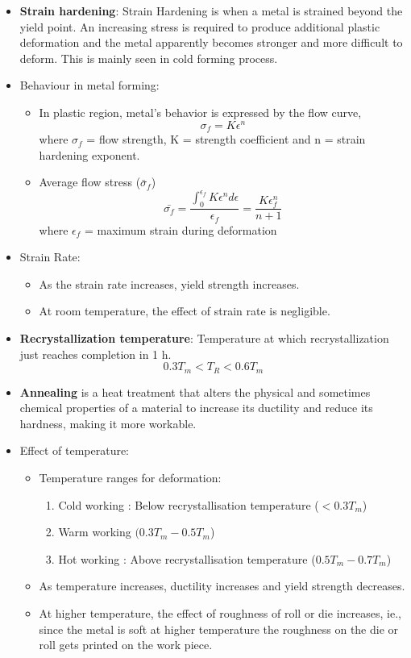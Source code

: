 \documentclass{article}
\begin{document}
	\begin{itemize}
		\item \textbf{Strain hardening}: Strain Hardening is when a metal is strained beyond the yield point. An increasing stress is required to produce additional plastic deformation and the metal apparently becomes stronger and more difficult to deform. This is mainly seen in cold forming process. 

		\item Behaviour in metal forming:
			\begin{itemize}
				\item In plastic region, metal's behavior is expressed by the flow curve, 
					\[\boxed{\sigma_f = K \epsilon^n}\]
				where $\sigma_f$ = flow strength, K = strength coefficient and n = strain hardening exponent. 
				\item Average flow stress (${\bar \sigma_f}$)
					\[{\bar{\sigma_f}= \frac{\int_0^{\epsilon_f} K \epsilon^n d\epsilon}{\epsilon_f} = \frac{K \epsilon_f^n}{n+1}}\]
				where $\epsilon_f$ = maximum strain during deformation
			\end{itemize}

		\item Strain Rate:
			\begin{itemize}
				\item As the strain rate increases, yield strength increases. 
				\item At room temperature, the effect of strain rate is negligible. 
			\end{itemize}

		\item \textbf{Recrystallization temperature}: Temperature at which recrystallization just reaches completion in 1 h.
		\[0.3T_m < T_R < 0.6T_m\]
		\item \textbf{Annealing} is a heat treatment that alters the physical and sometimes chemical properties of a material to increase its ductility and reduce its hardness, making it more workable.

		\item Effect of temperature:
			\begin{itemize}
				\item Temperature ranges for deformation:
					\begin{enumerate}
						\item Cold working : Below recrystallisation temperature ($<0.3 T_m$)
						\item Warm working $(0.3 T_m - 0.5 T_m$)
						\item Hot working : Above recrystallisation temperature ($0.5 T_m - 0.7 T_m$)
					\end{enumerate}
				\item As temperature increases, ductility increases and yield strength decreases. 
				\item At higher temperature, the effect of roughness of roll or die increases, ie., since the metal is soft at higher temperature the roughness on the die or roll gets printed on the work piece. 
			\end{itemize}


\end{itemize}
\end{document}
